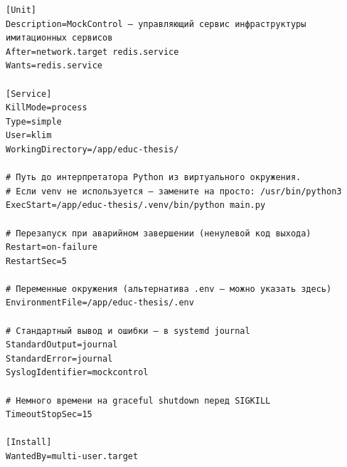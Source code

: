

\clearpage
\begin{listing}[H]
\caption{Файл юнита systemd mockcontrol.service}
\label{lst:mockcontrol-service}
\begin{mdframed}
\begin{verbatim}
[Unit]
Description=MockControl — управляющий сервис инфраструктуры имитационных сервисов
After=network.target redis.service
Wants=redis.service

[Service]
KillMode=process
Type=simple
User=klim
WorkingDirectory=/app/educ-thesis/

# Путь до интерпретатора Python из виртуального окружения.
# Если venv не используется — замените на просто: /usr/bin/python3
ExecStart=/app/educ-thesis/.venv/bin/python main.py

# Перезапуск при аварийном завершении (ненулевой код выхода)
Restart=on-failure
RestartSec=5

# Переменные окружения (альтернатива .env — можно указать здесь)
EnvironmentFile=/app/educ-thesis/.env

# Стандартный вывод и ошибки — в systemd journal
StandardOutput=journal
StandardError=journal
SyslogIdentifier=mockcontrol

# Немного времени на graceful shutdown перед SIGKILL
TimeoutStopSec=15

[Install]
WantedBy=multi-user.target
\end{verbatim}
\end{mdframed}
\end{listing}

